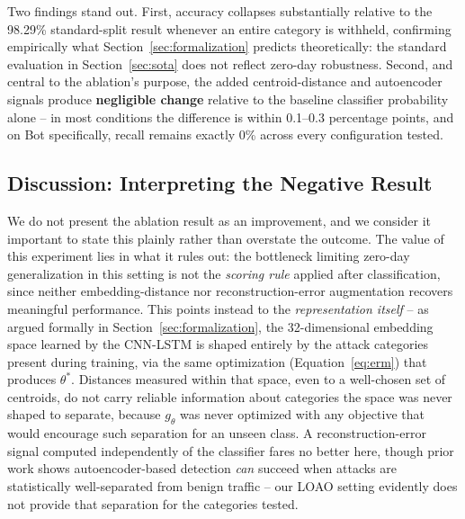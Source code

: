 \documentclass[11pt]{article}
\begin{document}
Two findings stand out. First, accuracy collapses substantially relative to the 98.29\%
standard-split result whenever an entire category is withheld, confirming empirically what
Section~\ref{sec:formalization} predicts theoretically: the standard evaluation in
Section~\ref{sec:sota} does not reflect zero-day robustness. Second, and central to the ablation's
purpose, the added centroid-distance and autoencoder signals produce \textbf{negligible change}
relative to the baseline classifier probability alone -- in most conditions the difference is within
0.1--0.3 percentage points, and on Bot specifically, recall remains exactly 0\% across every
configuration tested.

\subsection{Discussion: Interpreting the Negative Result}
\label{sec:discussion}

We do not present the ablation result as an improvement, and we consider it important to state this
plainly rather than overstate the outcome. The value of this experiment lies in what it rules out:
the bottleneck limiting zero-day generalization in this setting is not the \emph{scoring rule}
applied after classification, since neither embedding-distance nor reconstruction-error augmentation
recovers meaningful performance. This points instead to the \emph{representation itself} -- as
argued formally in Section~\ref{sec:formalization}, the 32-dimensional embedding space learned by
the CNN-LSTM is shaped entirely by the attack categories present during training, via the same
optimization (Equation~\ref{eq:erm}) that produces $\theta^{*}$. Distances measured within that
space, even to a well-chosen set of centroids, do not carry reliable information about categories
the space was never shaped to separate, because $g_\theta$ was never optimized with any objective
that would encourage such separation for an unseen class. A reconstruction-error signal computed
independently of the classifier fares no better here, though prior work shows autoencoder-based
detection \emph{can} succeed when attacks are statistically well-separated from benign traffic
\cite{hindy2020} -- our LOAO setting evidently does not provide that separation for the categories
tested.
\end{document}
